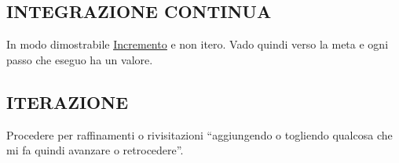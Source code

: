 		\subsection{INTEGRAZIONE CONTINUA}  \label{integrazione}
		In modo dimostrabile \underline{\hyperref[incremento]{Incremento}} e non itero. Vado quindi verso la meta e ogni passo che eseguo ha un valore.


		\subsection{ITERAZIONE}  \label{iterazione}
		Procedere per raffinamenti o rivisitazioni ``aggiungendo o togliendo qualcosa che mi fa quindi avanzare o retrocedere''.
